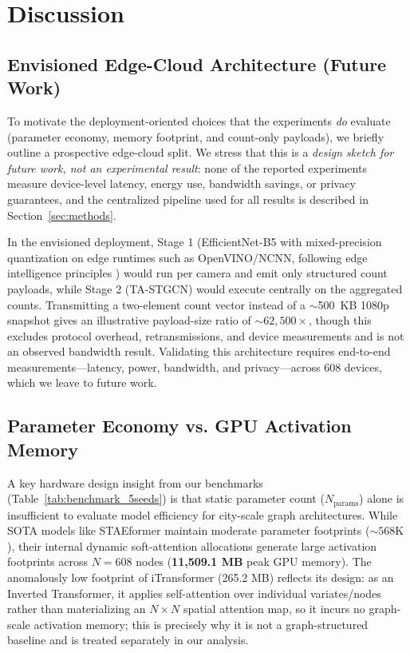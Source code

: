 \documentclass[a4paper,fleqn]{cas-sc}
\begin{document}
\section{Discussion}
\label{sec:deployment_limitations}

\subsection{Envisioned Edge-Cloud Architecture (Future Work)}
\label{sec:deployment_arch}

To motivate the deployment-oriented choices that the experiments \emph{do} evaluate (parameter economy, memory footprint, and count-only payloads), we briefly outline a prospective edge-cloud split. We stress that this is a \emph{design sketch for future work, not an experimental result}: none of the reported experiments measure device-level latency, energy use, bandwidth savings, or privacy guarantees, and the centralized pipeline used for all results is described in Section~\ref{sec:methods}.

In the envisioned deployment, Stage 1 (EfficientNet-B5 with mixed-precision quantization on edge runtimes such as OpenVINO/NCNN, following edge intelligence principles \cite{edge_intelligence, edge_its_survey}) would run per camera and emit only structured count payloads, while Stage 2 (TA-STGCN) would execute centrally on the aggregated counts. Transmitting a two-element count vector instead of a $\sim$500~KB 1080p snapshot gives an illustrative payload-size ratio of $\sim$$62{,}500\times$, though this excludes protocol overhead, retransmissions, and device measurements and is not an observed bandwidth result. Validating this architecture requires end-to-end measurements---latency, power, bandwidth, and privacy---across 608 devices, which we leave to future work.

\subsection{Parameter Economy vs. GPU Activation Memory}

A key hardware design insight from our benchmarks (Table~\ref{tab:benchmark_5seeds}) is that static parameter count ($N_{\text{params}}$) alone is insufficient to evaluate model efficiency for city-scale graph architectures. While SOTA models like STAEformer maintain moderate parameter footprints ($\sim 568\text{K}$), their internal dynamic soft-attention allocations generate large activation footprints across $N=608$ nodes (\textbf{11,509.1 MB} peak GPU memory). The anomalously low footprint of iTransformer (265.2 MB) reflects its design: as an Inverted Transformer, it applies self-attention over individual variates/nodes rather than materializing an $N \times N$ spatial attention map, so it incurs no graph-scale activation memory; this is precisely why it is not a graph-structured baseline and is treated separately in our analysis.
\end{document}
